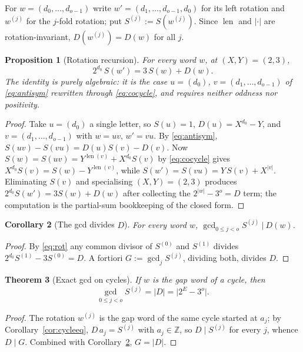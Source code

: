 \documentclass[11pt,a4paper]{article}
\theoremstyle{bourbaki}
\newtheorem{thm}{Theorem}[section]
\newtheorem{prop}[thm]{Proposition}
\newtheorem{cor}[thm]{Corollary}
\theoremstyle{bourbakidef}
\newcommand{\Z}{\mathbb{Z}}
\DeclareMathOperator{\len}{len}
\begin{document}
For $w=(d_{0},\dots,d_{o-1})$ write $w'=(d_{1},\dots,d_{o-1},d_{0})$ for its left rotation
and $w^{(j)}$ for the $j$-fold rotation; put $S^{(j)}:=S(w^{(j)})$. Since $\len$ and
$\lvert\cdot\rvert$ are rotation-invariant, $D(w^{(j)})=D(w)$ for all $j$.

\begin{prop}[Rotation recursion]\label{prop:rot}
For every word $w$, at $(X,Y)=(2,3)$,
\begin{equation}\label{eq:rot}
   2^{d_{0}}\,S(w')=3\,S(w)+D(w).
\end{equation}
The identity is purely algebraic: it is the case $u=(d_{0})$, $v=(d_{1},\dots,d_{o-1})$ of
\eqref{eq:antisym} rewritten through \eqref{eq:cocycle}, and requires neither oddness nor
positivity.
\end{prop}

\begin{proof}
Take $u=(d_{0})$ a single letter, so $S(u)=1$, $D(u)=X^{d_{0}}-Y$, and
$v=(d_{1},\dots,d_{o-1})$ with $w=uv$, $w'=vu$. By \eqref{eq:antisym},
$S(uv)-S(vu)=D(u)S(v)-D(v)$. Now $S(w)=S(uv)=Y^{\len(v)}+X^{d_{0}}S(v)$ by
\eqref{eq:cocycle} gives $X^{d_{0}}S(v)=S(w)-Y^{\len(v)}$, while
$S(w')=S(vu)=Y\,S(v)+X^{\lvert v\rvert}$. Eliminating $S(v)$ and specialising
$(X,Y)=(2,3)$ produces $2^{d_{0}}S(w')=3S(w)+D(w)$ after collecting the
$2^{|w|}-3^{o}=D$ term; the computation is the partial-sum bookkeeping of the closed form.
\end{proof}

\begin{cor}[The gcd divides $D$]\label{cor:gcdD}
For every word $w$, $\displaystyle \gcd_{0\le j<o}S^{(j)}\ \big|\ D(w)$.
\end{cor}

\begin{proof}
By \eqref{eq:rot} any common divisor of $S^{(0)}$ and $S^{(1)}$ divides
$2^{d_{0}}S^{(1)}-3S^{(0)}=D$. A fortiori $G:=\gcd_{j}S^{(j)}$, dividing both, divides $D$.
\end{proof}

\begin{thm}[Exact gcd on cycles]\label{thm:exact}
If $w$ is the gap word of a cycle, then
\[
   \gcd_{0\le j<o}S^{(j)}=\lvert D\rvert=\lvert 2^{E}-3^{o}\rvert.
\]
\end{thm}

\begin{proof}
The rotation $w^{(j)}$ is the gap word of the same cycle started at $a_{j}$; by
Corollary~\ref{cor:cycleeq}, $D\,a_{j}=S^{(j)}$ with $a_{j}\in\Z$, so $D\mid S^{(j)}$ for
every $j$, whence $D\mid G$. Combined with Corollary~\ref{cor:gcdD}, $G=\lvert D\rvert$.
\end{proof}
\end{document}
